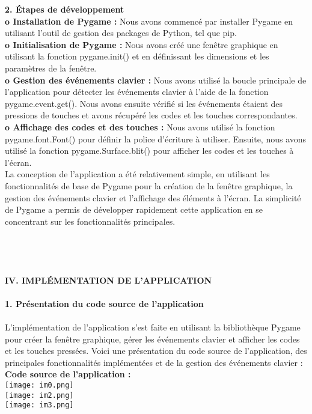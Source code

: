 \documentclass[a4paper, 12px]{article}
\begin{document}
{\bfseries 2.	Étapes de développement }\\

{\bfseries o	Installation de Pygame :} Nous avons commencé par installer Pygame en utilisant l'outil de gestion des packages de Python, tel que pip.\\
{\bfseries o	Initialisation de Pygame :} Nous avons créé une fenêtre graphique en utilisant la fonction pygame.init() et en définissant les dimensions et les paramètres de la fenêtre.\\
{\bfseries o	Gestion des événements clavier :} Nous avons utilisé la boucle principale de l'application pour détecter les événements clavier à l'aide de la fonction pygame.event.get(). Nous avons ensuite vérifié si les événements étaient des pressions de touches et avons récupéré les codes et les touches correspondantes.\\
{\bfseries o	Affichage des codes et des touches :} Nous avons utilisé la fonction pygame.font.Font() pour définir la police d'écriture à utiliser. Ensuite, nous avons utilisé la fonction pygame.Surface.blit() pour afficher les codes et les touches à l'écran.\\

La conception de l'application a été relativement simple, en utilisant les fonctionnalités de base de Pygame pour la création de la fenêtre graphique, la gestion des événements clavier et l'affichage des éléments à l'écran. La simplicité de Pygame a permis de développer rapidement cette application en se concentrant sur les fonctionnalités principales.
\\
\\
\\
\\
\\
{\bfseries \MakeUppercase{IV. Implémentation de l'application}\\
\\
1.	Présentation du code source de l'application}\\
\\
L'implémentation de l'application s'est faite en utilisant la bibliothèque Pygame pour créer la fenêtre graphique, gérer les événements clavier et afficher les codes et les touches pressées. Voici une présentation du code source de l'application, des principales fonctionnalités implémentées et de la gestion des événements clavier :
{\bfseries Code source de l'application :}\\

\texttt{[image: im0.png]}\\
\texttt{[image: im2.png]}\\
\texttt{[image: im3.png]}\\
\\
\end{document}
